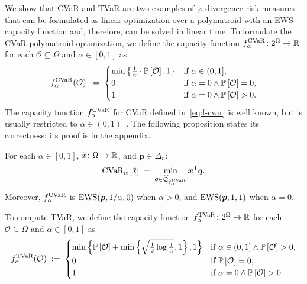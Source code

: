 We show that CVaR and TVaR are two examples of $\varphi$-divergence risk measures that can be formulated as linear optimization over a polymatroid with an EWS capacity function and, therefore, can be solved in linear time. To formulate the CVaR polymatroid optimization, we define the capacity function $f_{\alpha}^{\operatorname{CVaR}}\colon 2^{\Omega } \to \mathbb{R}$  for each $\mathcal{O} \subseteq \Omega$ and $\alpha \in [0,1]$ as
\begin{equation} \label{eq:f-cvar}
  f_{\alpha}^{\operatorname{CVaR}}(\mathcal{O})
    \;:=\;
      \begin{cases}
        \min\left\{\frac{1}{\alpha} \cdot \mathbb{P}\left[ \mathcal{O} \right], 1\right\} & \text{if } \alpha \in (0,1], \\
        0 & \text{if } \alpha = 0 \wedge \mathbb{P}\left[ \mathcal{O} \right] = 0,  \\
        1 & \text{if } \alpha = 0 \wedge \mathbb{P}\left[ \mathcal{O} \right] > 0. 
      \end{cases} 
\end{equation}
The capacity function $f_{\alpha }^{\operatorname{CVaR}}$ for CVaR defined in~\eqref{eq:f-cvar} is well known, but is usually restricted to $\alpha\in (0,1)$~\cite{acerbi2002spectral}. The following proposition states its correctness; its proof is in the appendix.
\begin{proposition} \label{prop:cvar-ews-correct}
For each $\alpha\in [0,1]$, $\tilde{x} \colon \Omega \to \mathbb{R}$, and $\bm{p} \in \Delta_n$: 
\begin{equation} \label{eq:cvar-correct}
  \operatorname{CVaR}_{\alpha } \left[\tilde{x} \right]
  \;=\;
  \min_{\bm{q} \in \widehat{\mathcal{Q}}_{f_{\alpha }^{\operatorname{CVaR}}}} \bm{x}^{\mathsf{T}} \bm{q}.
\end{equation}
Moreover, $f^{\operatorname{CVaR}}_{\alpha }$ is $\operatorname{EWS}(\bm{p}, 1/\alpha, 0)$ when $\alpha > 0$, and $\operatorname{EWS}(\bm{p}, 1, 1)$ when $\alpha = 0$.
\end{proposition}

To compute TVaR, we define the capacity function $f_{\alpha}^{\operatorname{TVaR}}\colon 2^{\Omega } \to \mathbb{R}$  for each $\mathcal{O} \subseteq \Omega$ and $\alpha \in [0,1]$ as
\begin{equation}\label{eq:f-tvar}
  f^{\operatorname{TVaR}}_{\alpha}(\mathcal{O})
    \; :=\; 
      \begin{cases}
        \min\left\{\mathbb{P}\left[ \mathcal{O} \right] + \min \left\{ \sqrt{\frac{1}{2} \log \frac{1}{\alpha}}, 1\right\}, 1\right\} &\text{if } \alpha \in (0,1] \wedge \mathbb{P}\left[ \mathcal{O} \right] > 0, \\
        0 & \text{if } \mathbb{P}\left[ \mathcal{O} \right] = 0, \\
        1 & \text{if } \alpha = 0 \wedge \mathbb{P}\left[ \mathcal{O} \right] > 0.
      \end{cases}
\end{equation}

